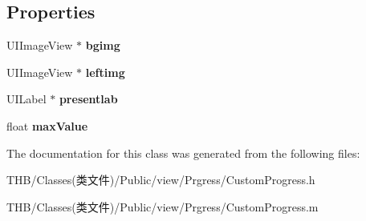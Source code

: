 \subsection*{Properties}
\begin{DoxyCompactItemize}
\item 
\mbox{\label{interface_custom_progress_a3d1bd2b892e0ef78653beef821d3de62}} 
U\+I\+Image\+View $\ast$ {\bfseries bgimg}
\item 
\mbox{\label{interface_custom_progress_aa7da94354ccd7b7aa253641b60f6701b}} 
U\+I\+Image\+View $\ast$ {\bfseries leftimg}
\item 
\mbox{\label{interface_custom_progress_a726e5bdf1c0a1b1bb7618126d8039037}} 
U\+I\+Label $\ast$ {\bfseries presentlab}
\item 
\mbox{\label{interface_custom_progress_a5a90ac1667d415978ac0a15e6da7e689}} 
float {\bfseries max\+Value}
\end{DoxyCompactItemize}


The documentation for this class was generated from the following files\+:\begin{DoxyCompactItemize}
\item 
T\+H\+B/\+Classes(类文件)/\+Public/view/\+Prgress/Custom\+Progress.\+h\item 
T\+H\+B/\+Classes(类文件)/\+Public/view/\+Prgress/Custom\+Progress.\+m\end{DoxyCompactItemize}
